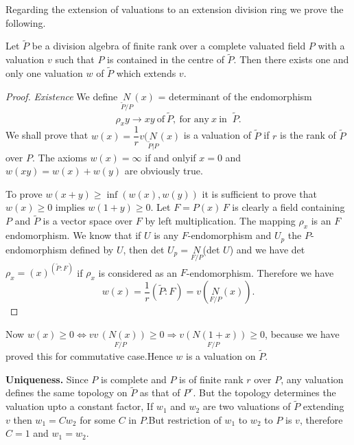 Regarding the extension of valuations to an extension division ring we
prove the following. 

\begin{theorem}\label{part1:chap2:sec8:thm4} %
  Let $\widetilde{P}$ be a division algebra of finite rank over a
  complete valuated field $P$ with a valuation $v$ such that $P$ is
  contained  in the centre of $\widetilde{P}$. Then there exists one
  and only one valuation $w$ of $\widetilde{P}$ which extends $v$. 
\end{theorem}

\begin{proof}
  \textit{Existence} We define
  $ \underset{\widetilde{P}/P} N (x)$ = determinant of the endomorphism
  $$
  \rho_x y \to xy ~\text{of}~ \tilde{P}, ~\text{for any}~ x ~\text{
    in }~ \tilde{P}. 
  $$
  We shall prove that $w(x)= \dfrac{1}{r} v(\underset{\widetilde{P} |
    P}N (x)$ is a valuation of $\widetilde{P}$ if $r$ is the rank of
  $\widetilde{P}$ over $P$. The axioms $w(x)= \infty$ if and
  only\pageoriginale if 
  $x=0$ and $w(x y)= w(x)+w(y)$ are obviously true. 

To prove $w(x+y) \ge  \inf (w(x),w(y))$ it is sufficient to prove that
$w(x) \ge 0$ implies $ w(1+y)\ge 0$. Let $F=P(x)\, F$ is clearly a field
containing $P$ and $\widetilde{P}$ is a vector space over $F$ by left
multiplication. The mapping $\rho_x$ is an $F$ endomorphism. We know
that if $U$ is any $F$-endomorphism and $U_p$ the $P$-endomorphism
defined by $U$, then det $U_p = \underset {F/P} N$(det $U$) and we have
det $\rho _x =(x)^{(\tilde{P}: F)}$ if $\rho_x$ is considered as an
$F$-endomorphism. Therefore we have 
$$
w(x)=\frac{1}{r}(\widetilde{P}:F) =v (\underset{F/P}N(x)).
$$
\end{proof}

Now $w(x) \ge 0 \Longleftrightarrow v \underset{F/P}{v\,(N(x))} \ge 0
\Longrightarrow \underset{F/P}{v(N(1+x))} \ge 0$, because we have proved this
for commutative case.Hence $w$ is a valuation on $\tilde{P}$. 

\medskip
\noindent 
\textbf{Uniqueness.}  
Since $P$ is complete and $P$ is of finite rank $r$ over $P$, any
valuation defines the same topology on $\tilde{P}$ as that of
$P^r$. But the topology determines the valuation upto a constant
factor, If $w_1$ and $w_2$ are two valuations of $\widetilde{P}$
extending $v$ then $w_1 = C w_2$ for some $C$ in $P$.But restriction
of $w_1$ to $w_2$ to $P$ is $v$, therefore $C=1$ and $w_1 =w_2$. 
